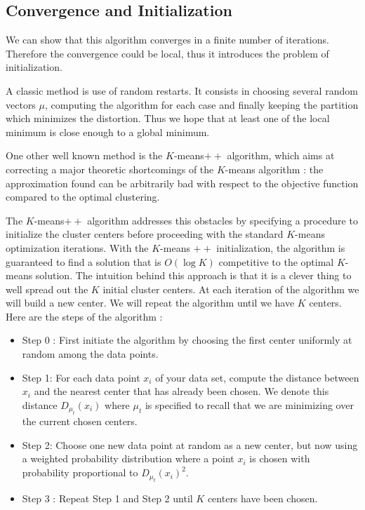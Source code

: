 \documentclass[12pt]{report}
\begin{document}
\subsection{Convergence and Initialization}

We can show that this algorithm converges in a finite number of iterations. Therefore the convergence could be local, thus it introduces the problem of initialization. 

A classic method is use of random restarts. It consists in choosing several random vectors $\mu$, computing the algorithm for each case and finally keeping the partition which minimizes the distortion. Thus we hope that at least one of the local minimum is close enough to a global minimum.

One other well known method is the $K$-means$++$ algorithm, which aims at correcting a major theoretic shortcomings of the $K$-means algorithm : the approximation found can be arbitrarily bad with respect to the objective function compared to the optimal clustering.
 
The $K$-means$++$ algorithm addresses this obstacles by specifying a procedure to initialize the cluster centers before proceeding with the standard $K$-means optimization iterations. With the $K$-means $++$ initialization, the algorithm is guaranteed to find a solution that is $O(\log K)$ competitive to the optimal $K$-means solution. 
\newpage
The intuition behind this approach is that it is a clever thing to well spread out the $K$ initial cluster centers. At each iteration of the algorithm we will build a new center. We will repeat the algorithm until we  have $K$ centers. Here are the steps of the algorithm : 

\begin{itemize}
\item Step 0 : First initiate the algorithm by choosing the first center uniformly at random among the data points. 

\item Step 1: For each data point $x_i$ of your data set, compute the distance between $x_i$ and the nearest center that has already been chosen. We denote this distance $D_{\mu_t}(x_i)$ where $\mu_t$ is specified to recall that we are minimizing over the current chosen centers.
 
\item Step 2: Choose one new data point at random as a new center, but now using a weighted probability distribution where a point $x_i$ is chosen with probability proportional to $D_{\mu_t}(x_i)^2$.

\item Step 3 : Repeat Step 1 and Step 2 until $K$ centers have been chosen.

\end{itemize}
\end{document}
